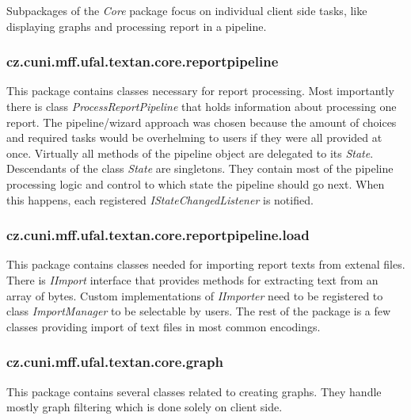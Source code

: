 Subpackages of the \emph{Core} package focus on individual client side tasks,
like displaying graphs and processing report in a pipeline.


\subsubsection{cz.cuni.mff.ufal.textan.core.reportpipeline}
\label{sssec:ReportPipeline}

This package contains classes necessary for report processing. Most importantly
there is class \emph{ProcessReportPipeline} that holds information about
processing one report. The pipeline/wizard approach was chosen because the
amount of choices and required tasks would be overhelming to users if they were
all provided at once. Virtually all methods of the pipeline object are delegated
to its \emph{State}. Descendants of the class \emph{State} are singletons. They
contain most of the pipeline processing logic and control to which state the
pipeline should go next. When this happens, each registered
\emph{IStateChangedListener} is notified.



\subsubsection{cz.cuni.mff.ufal.textan.core.reportpipeline.load}

This package contains classes needed for importing report texts from extenal
files. There is \emph{IImport} interface that provides methods for extracting
text from an array of bytes. Custom implementations of \emph{IImporter} need
to be registered to class \emph{ImportManager} to be selectable by users. The
rest of the package is a few classes providing import of text files in most
common encodings.

\subsubsection{cz.cuni.mff.ufal.textan.core.graph}

This package contains several classes related to creating graphs. They handle
mostly graph filtering which is done solely on client side.


